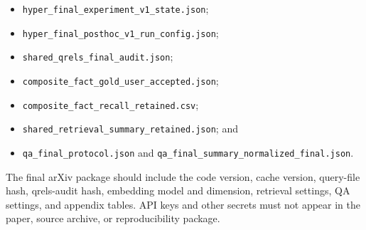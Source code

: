 \begin{itemize}
\item \texttt{hyper\_final\_experiment\_v1\_state.json};
\item \texttt{hyper\_final\_posthoc\_v1\_run\_config.json};
\item \texttt{shared\_qrels\_final\_audit.json};
\item \texttt{composite\_fact\_gold\_user\_accepted.json};
\item \texttt{composite\_fact\_recall\_retained.csv};
\item \texttt{shared\_retrieval\_summary\_retained.json}; and
\item \texttt{qa\_final\_protocol.json} and \texttt{qa\_final\_summary\_normalized\_final.json}.
\end{itemize}

The final arXiv package should include the code version, cache version, query-file hash, qrels-audit hash, embedding model and dimension, retrieval settings, QA settings, and appendix tables. API keys and other secrets must not appear in the paper, source archive, or reproducibility package.
